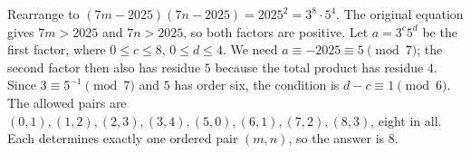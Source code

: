 Rearrange to $(7m-2025)(7n-2025)=2025^2=3^8\cdot5^4$. The original equation gives $7m>2025$ and $7n>2025$, so both factors are positive. Let $a=3^c5^d$ be the first factor, where $0\le c\le8$, $0\le d\le4$. We need $a\equiv-2025\equiv5\pmod7$; the second factor then also has residue $5$ because the total product has residue $4$. Since $3\equiv5^{-1}\pmod7$ and $5$ has order six, the condition is $d-c\equiv1\pmod6$. The allowed pairs are $(0,1),(1,2),(2,3),(3,4),(5,0),(6,1),(7,2),(8,3)$, eight in all. Each determines exactly one ordered pair $(m,n)$, so the answer is $\boxed8$.
